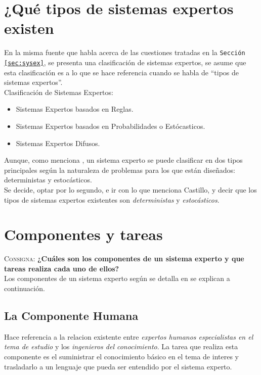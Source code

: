 \documentclass{article}
\begin{document}
\section{¿Qu\'e tipos de sistemas expertos existen}
\label{sec:sysext}
En la misma fuente que habla acerca de las cuestiones tratadas en la
\texttt{Secci\'on \ref{sec:sysex}}, se presenta una clasificaci\'on de sistemas
expertos, se asume que esta clasificaci\'on es a lo que se hace referencia
cuando se habla de ``tipos de sistemas expertos''.\\

Clasificaci\'on de Sistemas Expertos:
\begin{itemize}
\item Sistemas Expertos basados en Reglas.
\item Sistemas Expertos basados en Probabilidades o Est\'ocasticos.
\item Sistemas Expertos Difusos.
\end{itemize}

Aunque, como menciona \cite{castillo}, un sistema experto se puede clasificar
en dos tipos principales seg\'un la naturaleza de problemas para los que
est\'an diseñados: deterministas y estoc\'asticos.\\

Se decide, optar por lo segundo, e ir con lo que menciona Castillo, y decir que
los tipos de sistemas expertos existentes son \textit{deterministas} y
\textit{estoc\'asticos}.


\section{Componentes y tareas}
\label{sec:sysextcomponentesytareas}
\textsc{Consigna}: \textbf{¿Cu\'ales son los componentes de un sistema experto
y que tareas realiza cada uno de ellos?}\\

Los componentes de un sistema experto seg\'un se detalla en \cite{castillo} se
explican a continuaci\'on.

\subsection{La Componente Humana}
\label{sub:comphum}
Hace referencia a la relacion existente entre \textit{expertos humanos
especialistas en el tema de estudio} y los \textit{ingenieros del
conocimiento}. La tarea que realiza esta componente es el suministrar el
conocimiento b\'asico en el tema de interes y trasladarlo a un lenguaje que
pueda ser entendido por el sistema experto.
\end{document}
